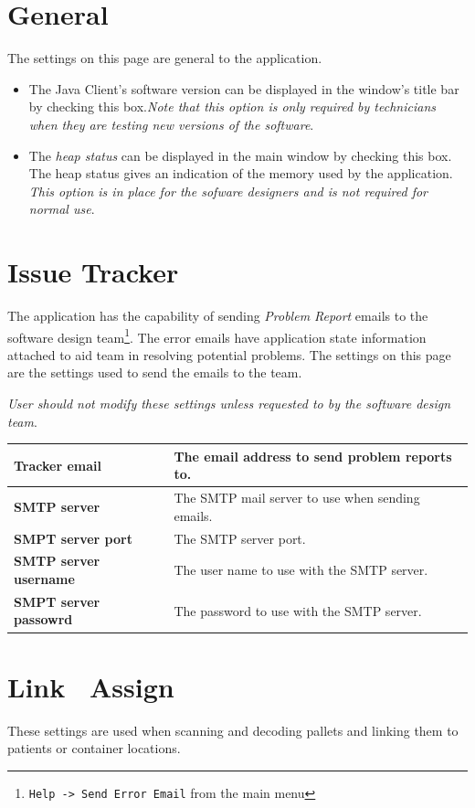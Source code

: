 \section{General}
The settings on this page are general to the application.
\begin{itemize}
  \item The Java Client's software version can be displayed in the window's
    title bar by checking this box.\textit{Note that this option is only
      required by technicians when they are testing new versions of the
      software}.
  \item The \emph{heap status} can be displayed in the main window by checking
    this box. The heap status gives an indication of the memory used by the
    application. \textit{This option is in place for the sofware designers and
      is not required for normal use}.
\end{itemize}

\section{Issue Tracker}
The application has the capability of sending \emph{Problem Report} emails to
the software design team\footnote{\texttt{Help -> Send Error Email} from the
  main menu}. The error emails have application state information attached to
aid team in resolving potential problems. The settings on this page are the
settings used to send the emails to the team.

\textit{User should not modify these settings unless requested to by the software
  design team}.
\begin{center}
\begin{tabular}{|l|p{3.5in}|}
  \hline
  \textbf{Tracker email} & The email address to send problem reports to.\\
  \hline
  \textbf{SMTP server} & The SMTP mail server to use when sending emails.\\
  \hline
  \textbf{SMPT server port} & The SMTP server port.\\
  \hline
  \textbf{SMTP server username} & The user name to use with the SMTP server.\\
  \hline
  \textbf{SMPT server passowrd} & The password to use with the SMTP server.\\
  \hline
\end{tabular}
\end{center}


\section{Link \ Assign}
These settings are used when scanning and decoding pallets and linking them to
patients or container locations.

